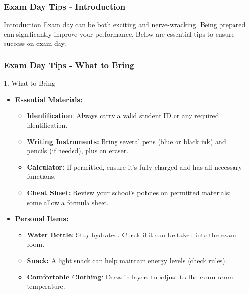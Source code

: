 \documentclass{beamer}
\begin{document}
\begin{frame}[fragile]
    \frametitle{Exam Day Tips - Introduction}
    \begin{block}{Introduction}
        Exam day can be both exciting and nerve-wracking. Being prepared can significantly improve your performance. Below are essential tips to ensure success on exam day.
    \end{block}
\end{frame}

\begin{frame}[fragile]
    \frametitle{Exam Day Tips - What to Bring}
    \begin{block}{1. What to Bring}
        \begin{itemize}
            \item \textbf{Essential Materials:}
                \begin{itemize}
                    \item \textbf{Identification:} Always carry a valid student ID or any required identification.
                    \item \textbf{Writing Instruments:} Bring several pens (blue or black ink) and pencils (if needed), plus an eraser.
                    \item \textbf{Calculator:} If permitted, ensure it’s fully charged and has all necessary functions.
                    \item \textbf{Cheat Sheet:} Review your school’s policies on permitted materials; some allow a formula sheet.
                \end{itemize}
            \item \textbf{Personal Items:}
                \begin{itemize}
                    \item \textbf{Water Bottle:} Stay hydrated. Check if it can be taken into the exam room.
                    \item \textbf{Snack:} A light snack can help maintain energy levels (check rules).
                    \item \textbf{Comfortable Clothing:} Dress in layers to adjust to the exam room temperature.
                \end{itemize}
        \end{itemize}
    \end{block}
\end{frame}
\end{document}
